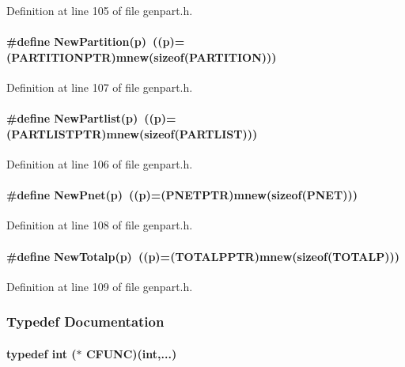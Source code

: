 Definition at line 105 of file genpart.h.\label{genpart.h_a3}
\paragraph{\setlength{\rightskip}{0pt plus 5cm}\#define New\-Partition(p)\ ((p)=({\bf PARTITIONPTR})mnew(sizeof({\bf PARTITION})))}\hfill



Definition at line 107 of file genpart.h.\label{genpart.h_a2}
\paragraph{\setlength{\rightskip}{0pt plus 5cm}\#define New\-Partlist(p)\ ((p)=({\bf PARTLISTPTR})mnew(sizeof({\bf PARTLIST})))}\hfill



Definition at line 106 of file genpart.h.\label{genpart.h_a4}
\paragraph{\setlength{\rightskip}{0pt plus 5cm}\#define New\-Pnet(p)\ ((p)=({\bf PNETPTR})mnew(sizeof({\bf PNET})))}\hfill



Definition at line 108 of file genpart.h.\label{genpart.h_a5}
\paragraph{\setlength{\rightskip}{0pt plus 5cm}\#define New\-Totalp(p)\ ((p)=({\bf TOTALPPTR})mnew(sizeof({\bf TOTALP})))}\hfill



Definition at line 109 of file genpart.h.

\subsubsection{Typedef Documentation}
\label{genpart.h_a11}
\paragraph{\setlength{\rightskip}{0pt plus 5cm}typedef int ($\ast$ CFUNC)(int,...)}\hfill



